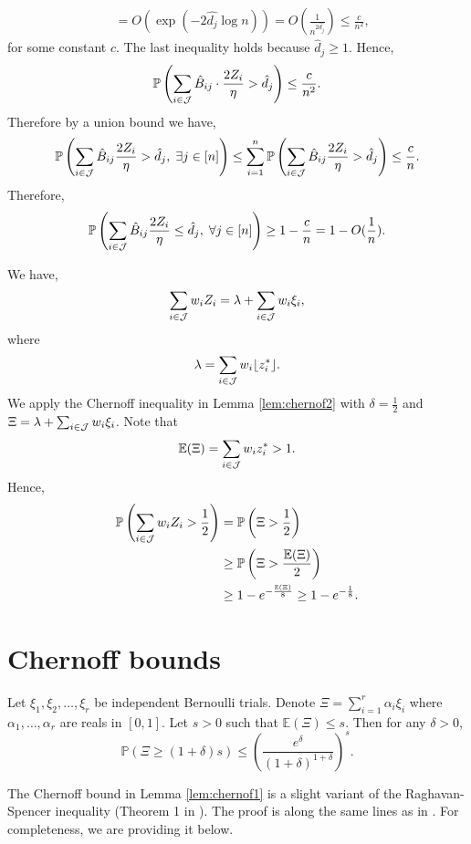 \documentclass[moor]{informs1}              %
\begin{document}
\begin{APPENDICES}
\begin{align*}
    & = O  \left( \exp \left( -2\hat{d_j}\log n \right) \right)  = O \left(\frac{1}{n^{2\hat{d_j}}} \right) \leq \frac{c}{n^2},
\end{align*}
for some constant $c$. The last inequality holds because $\hat{d}_j \geq 1$. Hence, 
$$\mathbb{P} \left(  \sum_{i \in {\cal J}} \hat{B}_{ij}  \cdot \frac{ 2Z_i}{\eta}      > \hat{d}_j  \right)  \leq \frac{c}{n^2}.$$
Therefore by a union bound we have,
$$ \mathbb{P} \left(  \sum_{i \in {\cal J}} \hat{B}_{ij} \frac{ 2 Z_i}{\eta}    > \hat{d}_j , \; \exists j \in [n] \right)  \leq \sum_{i=1}^n \mathbb{P} \left(  \sum_{i \in {\cal J}}\hat{B}_{ij} \frac{2 Z_i}{\eta}    > \hat{d}_j  \right)  \leq \frac{c}{n}.$$
Therefore,
$$ \mathbb{P} \left(  \sum_{i \in {\cal J}} \hat{B}_{ij} \frac{ 2 Z_i}{\eta}    \leq  \hat{d}_j , \; \forall j \in [n] \right)  \geq 1- \frac{c}{n}=1- O(\frac{1}{n}).$$
\hfill
\Halmos
\endproof

\vspace{2mm}


We have, 
$$ \sum_{ i\in {\cal J}} w_i  Z_i = \lambda +  \sum_{i \in {\cal J}}w_i {\xi}_i,$$
where
$$ \lambda =  \sum_{i \in {\cal J}} w_i \lfloor{z_i^*}\rfloor .$$
We apply the Chernoff inequality in Lemma \ref{lem:chernof2} with  $ \delta = \frac{1}{2}$ and $\Xi = \lambda +  \sum_{i \in {\cal J}}w_i {\xi}_i$. Note that $$\mathbb{E}(\Xi )=  \sum_{i \in {\cal J}}w_i  z_i^* > 1.$$ Hence,
\begin{align*}
\mathbb{P} \left(\sum_{i \in {\cal J}}w_i Z_i  > \frac{1}{2}\right) & =\mathbb{P} \left(\Xi >\frac{1}{2}\right)\\
&\geq \mathbb{P} \left(\Xi >\frac{\mathbb{E}(\Xi)}{2}\right)\\
& \geq 1 - e^{  -\frac{ \mathbb{E}(\Xi)}{8}}  \geq 1 - e^{  -\frac{ 1}{8}}.
\end{align*}
\hfill
\Halmos
\endproof


\section{Chernoff bounds}

  \begin{lemma}\label{lem:chernof1}
 Let ${\xi}_1,{\xi}_2,\ldots,{\xi}_r$ be independent Bernoulli trials. Denote $\Xi = \sum_{i=1}^r \alpha_i {\xi}_i$ where $\alpha_1, \ldots, \alpha_r $ are reals in $[0,1]$. Let $s >0$ such that $\mathbb{E}(\Xi) \leq s$. Then for any $ \delta >0$,
 $$ \mathbb{P}( \Xi \geq (1+ \delta ) s ) \leq  \left(  \frac{e^{\delta}}{(1+\delta)^{1+\delta} }    \right)^s.$$
 \end{lemma}
The Chernoff bound in Lemma \ref{lem:chernof1} is a slight variant of the Raghavan-Spencer inequality (Theorem 1 in \cite{raghavan1986probabilistic}).  The proof is along the same lines as in  \cite{raghavan1986probabilistic}. For completeness, we are providing it below.


\end{APPENDICES}
\end{document}
